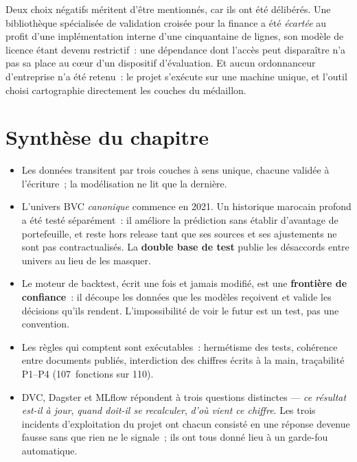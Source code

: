 Deux choix négatifs méritent d'être mentionnés, car ils ont été délibérés. Une
bibliothèque spécialisée de validation croisée pour la finance a été
\emph{écartée} au profit d'une implémentation interne d'une cinquantaine de
lignes, son modèle de licence étant devenu restrictif~: une dépendance dont
l'accès peut disparaître n'a pas sa place au cœur d'un dispositif d'évaluation.
Et aucun ordonnanceur d'entreprise n'a été retenu~: le projet s'exécute sur une
machine unique, et l'outil choisi cartographie directement les couches du
médaillon.

\section*{Synthèse du chapitre}

\begin{itemize}
  \item Les données transitent par trois couches à sens unique, chacune validée à
        l'écriture~; la modélisation ne lit que la dernière.
  \item L'univers BVC \emph{canonique} commence en 2021. Un historique marocain
        profond a été testé séparément~: il améliore la prédiction sans établir
        d'avantage de portefeuille, et reste hors release tant que ses sources et
        ses ajustements ne sont pas contractualisés. La \textbf{double base de
        test} publie les désaccords entre univers au lieu de les masquer.
  \item Le moteur de backtest, écrit une fois et jamais modifié, est une
        \textbf{frontière de confiance}~: il découpe les données que les modèles
        reçoivent et valide les décisions qu'ils rendent. L'impossibilité de voir
        le futur est un test, pas une convention.
  \item Les règles qui comptent sont exécutables~: hermétisme des tests,
        cohérence entre documents publiés, interdiction des chiffres écrits à la
        main, traçabilité P1--P4 (107~fonctions sur 110).
  \item DVC, Dagster et MLflow répondent à trois questions distinctes —
        \emph{ce résultat est-il à jour}, \emph{quand doit-il se recalculer},
        \emph{d'où vient ce chiffre}. Les trois incidents d'exploitation du projet
        ont chacun consisté en une réponse devenue fausse sans que rien ne le
        signale~; ils ont tous donné lieu à un garde-fou automatique.
\end{itemize}
